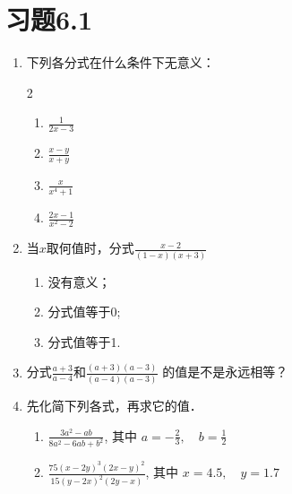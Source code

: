\section*{习题6.1}
\begin{enumerate}
    \item 下列各分式在什么条件下无意义：
 \begin{multicols}{2}
 \begin{enumerate}
     \item $\frac{1}{2x-3}$
     \item $\frac{x-y}{x+y}$
     \item $\frac{x}{x^4+1}$
     \item $\frac{2x-1}{x^2-2}$
 \end{enumerate}
 \end{multicols}
    \item 当$x$取何值时，分式$\frac{x-2}{(1-x)(x+3)}$
    \begin{enumerate}
        \item 没有意义；
        \item 分式值等于0;
        \item 分式值等于1.
    \end{enumerate}
\item 分式$\frac{a+3}{a-4}$和$\frac{(a+3)(a-3)}{(a-4)(a-3)}$
的值是不是永远相等？
\item 先化简下列各式，再求它的值．
\begin{enumerate}
    \item $\frac{3 a^{2}-a b}{8 a^{2}-6 a b+b^{2}}$, 其中 $a=- \frac{2}{3}, \quad b=\frac{1}{2}$
    \item  $\frac{75(x-2 y)^{3}(2 x-y)^{2}}{15(y-2 x)^{2}(2 y-x)}$, 其中 $x=4.5,\quad y=1.7$
\end{enumerate}


\end{enumerate}
